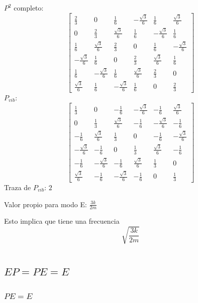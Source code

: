 \documentclass[12pt]{amsart}
\begin{document}
$P^2$ completo:
 $$\left[\begin{matrix}\frac{2}{3} & 0 & \frac{1}{6} & - \frac{\sqrt{3}}{6} & \frac{1}{6} & \frac{\sqrt{3}}{6}\\0 & \frac{2}{3} & \frac{\sqrt{3}}{6} & \frac{1}{6} & - \frac{\sqrt{3}}{6} & \frac{1}{6}\\\frac{1}{6} & \frac{\sqrt{3}}{6} & \frac{2}{3} & 0 & \frac{1}{6} & - \frac{\sqrt{3}}{6}\\- \frac{\sqrt{3}}{6} & \frac{1}{6} & 0 & \frac{2}{3} & \frac{\sqrt{3}}{6} & \frac{1}{6}\\\frac{1}{6} & - \frac{\sqrt{3}}{6} & \frac{1}{6} & \frac{\sqrt{3}}{6} & \frac{2}{3} & 0\\\frac{\sqrt{3}}{6} & \frac{1}{6} & - \frac{\sqrt{3}}{6} & \frac{1}{6} & 0 & \frac{2}{3}\end{matrix}\right]$$
$P_{vib}$: $$\left[\begin{matrix}\frac{1}{3} & 0 & - \frac{1}{6} & - \frac{\sqrt{3}}{6} & - \frac{1}{6} & \frac{\sqrt{3}}{6}\\0 & \frac{1}{3} & \frac{\sqrt{3}}{6} & - \frac{1}{6} & - \frac{\sqrt{3}}{6} & - \frac{1}{6}\\- \frac{1}{6} & \frac{\sqrt{3}}{6} & \frac{1}{3} & 0 & - \frac{1}{6} & - \frac{\sqrt{3}}{6}\\- \frac{\sqrt{3}}{6} & - \frac{1}{6} & 0 & \frac{1}{3} & \frac{\sqrt{3}}{6} & - \frac{1}{6}\\- \frac{1}{6} & - \frac{\sqrt{3}}{6} & - \frac{1}{6} & \frac{\sqrt{3}}{6} & \frac{1}{3} & 0\\\frac{\sqrt{3}}{6} & - \frac{1}{6} & - \frac{\sqrt{3}}{6} & - \frac{1}{6} & 0 & \frac{1}{3}\end{matrix}\right]$$
Traza de $P_{vib}$: $2$

Valor propio para modo E: $\frac{3 k}{2 m}$

Esto implica que tiene una frecuencia $$\sqrt{\frac{3 k}{2 m}}$$

\section{}

\subsection{$EP = PE = E$}

\subsubsection{$PE = E$}
\end{document}
